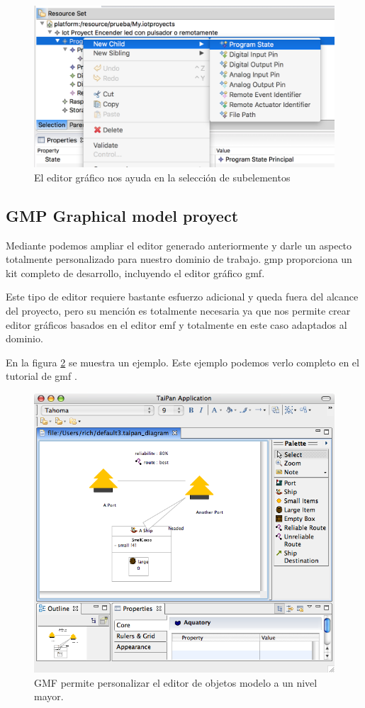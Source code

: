 \begin{figure}
	\centering
    \includegraphics[scale=0.4]{images/emf_capturas/runtime_editor_modelo2}
    \sourcepropia{}
    \caption{El editor gráfico nos ayuda en la selección de subelementos}
    \label{fig:runtime_editor_modelo2}
\end{figure}


\subsection{GMP Graphical model proyect}

Mediante \cite{gmp} podemos ampliar el editor generado anteriormente y darle un aspecto totalmente personalizado para nuestro dominio de trabajo.
\gls{gmp} proporciona un kit completo de desarrollo, incluyendo el editor gráfico \gls{gmf}.

Este tipo de editor requiere bastante esfuerzo adicional y queda fuera del alcance del proyecto, pero su mención es totalmente necesaria ya que nos permite crear editor gráficos basados en el editor \gls{emf} y totalmente en este caso adaptados al dominio.

En la figura \ref{fig:gmf_ejemplo} se muestra un ejemplo. Este ejemplo podemos verlo completo en el tutorial de \gls{gmf} \cite{gmf_tutorial}.

\begin{figure}
	\centering
    \includegraphics[scale=0.4]{images/emf_capturas/gmf_ejemplo}
    \caption{GMF permite personalizar el editor de objetos modelo a un nivel mayor.}
    \label{fig:gmf_ejemplo}
\end{figure}






